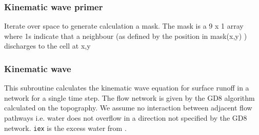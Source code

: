 



\begin{usessubs}
\end{usessubs}

\subsubsection{Kinematic wave primer}


Iterate over space to generate calculation a mask. The mask is a 9
x 1 array where 1s indicate that a neighbour (as defined by the position
in mask(x,y) ) discharges to the cell at x,y


\begin{usessubs}
\end{usessubs}

\subsubsection{Kinematic wave}


This subroutine calculates the kinematic wave equation for surface
runoff in a network for a single time step. The flow network is given
by the GD8 algorithm calculated on the topography. We assume no interaction
between adjacent flow pathways i.e. water does not overflow in a direction
not specified by the GD8 network. \texttt{iex} is the excess water
from . 

